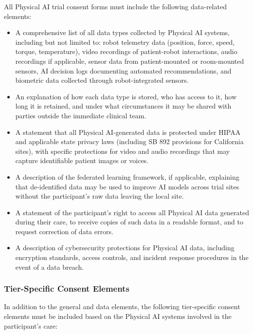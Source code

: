 All Physical AI trial consent forms must include the following data-related
elements:

\begin{itemize}
    \item A comprehensive list of all data types collected by Physical AI
    systems, including but not limited to: robot telemetry data (position,
    force, speed, torque, temperature), video recordings of patient-robot
    interactions, audio recordings if applicable, sensor data from
    patient-mounted or room-mounted sensors, AI decision logs documenting
    automated recommendations, and biometric data collected through
    robot-integrated sensors.

    \item An explanation of how each data type is stored, who has access to
    it, how long it is retained, and under what circumstances it may be
    shared with parties outside the immediate clinical team.

    \item A statement that all Physical AI-generated data is protected under
    HIPAA and applicable state privacy laws (including SB 892 provisions for
    California sites), with specific protections for video and audio
    recordings that may capture identifiable patient images or voices.

    \item A description of the federated learning framework, if applicable,
    explaining that de-identified data may be used to improve AI models
    across trial sites without the participant's raw data leaving the local
    site.

    \item A statement of the participant's right to access all Physical AI
    data generated during their care, to receive copies of such data in a
    readable format, and to request correction of data errors.

    \item A description of cybersecurity protections for Physical AI data,
    including encryption standards, access controls, and incident response
    procedures in the event of a data breach.
\end{itemize}

\subsubsection{Tier-Specific Consent Elements}

In addition to the general and data elements, the following tier-specific
consent elements must be included based on the Physical AI systems involved
in the participant's care:

